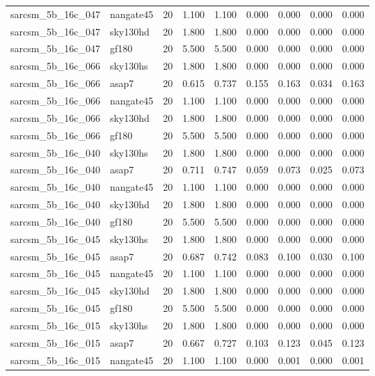 \begin{tabular}{llrrrrrrr}
sarcsm\_5b\_16c\_047 & nangate45 & 20 & 1.100 & 1.100 & 0.000 & 0.000 & 0.000 & 0.000 \\
sarcsm\_5b\_16c\_047 & sky130hd & 20 & 1.800 & 1.800 & 0.000 & 0.000 & 0.000 & 0.000 \\
sarcsm\_5b\_16c\_047 & gf180 & 20 & 5.500 & 5.500 & 0.000 & 0.000 & 0.000 & 0.000 \\
sarcsm\_5b\_16c\_066 & sky130hs & 20 & 1.800 & 1.800 & 0.000 & 0.000 & 0.000 & 0.000 \\
sarcsm\_5b\_16c\_066 & asap7 & 20 & 0.615 & 0.737 & 0.155 & 0.163 & 0.034 & 0.163 \\
sarcsm\_5b\_16c\_066 & nangate45 & 20 & 1.100 & 1.100 & 0.000 & 0.000 & 0.000 & 0.000 \\
sarcsm\_5b\_16c\_066 & sky130hd & 20 & 1.800 & 1.800 & 0.000 & 0.000 & 0.000 & 0.000 \\
sarcsm\_5b\_16c\_066 & gf180 & 20 & 5.500 & 5.500 & 0.000 & 0.000 & 0.000 & 0.000 \\
sarcsm\_5b\_16c\_040 & sky130hs & 20 & 1.800 & 1.800 & 0.000 & 0.000 & 0.000 & 0.000 \\
sarcsm\_5b\_16c\_040 & asap7 & 20 & 0.711 & 0.747 & 0.059 & 0.073 & 0.025 & 0.073 \\
sarcsm\_5b\_16c\_040 & nangate45 & 20 & 1.100 & 1.100 & 0.000 & 0.000 & 0.000 & 0.000 \\
sarcsm\_5b\_16c\_040 & sky130hd & 20 & 1.800 & 1.800 & 0.000 & 0.000 & 0.000 & 0.000 \\
sarcsm\_5b\_16c\_040 & gf180 & 20 & 5.500 & 5.500 & 0.000 & 0.000 & 0.000 & 0.000 \\
sarcsm\_5b\_16c\_045 & sky130hs & 20 & 1.800 & 1.800 & 0.000 & 0.000 & 0.000 & 0.000 \\
sarcsm\_5b\_16c\_045 & asap7 & 20 & 0.687 & 0.742 & 0.083 & 0.100 & 0.030 & 0.100 \\
sarcsm\_5b\_16c\_045 & nangate45 & 20 & 1.100 & 1.100 & 0.000 & 0.000 & 0.000 & 0.000 \\
sarcsm\_5b\_16c\_045 & sky130hd & 20 & 1.800 & 1.800 & 0.000 & 0.000 & 0.000 & 0.000 \\
sarcsm\_5b\_16c\_045 & gf180 & 20 & 5.500 & 5.500 & 0.000 & 0.000 & 0.000 & 0.000 \\
sarcsm\_5b\_16c\_015 & sky130hs & 20 & 1.800 & 1.800 & 0.000 & 0.000 & 0.000 & 0.000 \\
sarcsm\_5b\_16c\_015 & asap7 & 20 & 0.667 & 0.727 & 0.103 & 0.123 & 0.045 & 0.123 \\
sarcsm\_5b\_16c\_015 & nangate45 & 20 & 1.100 & 1.100 & 0.000 & 0.001 & 0.000 & 0.001 \\

\end{tabular}

